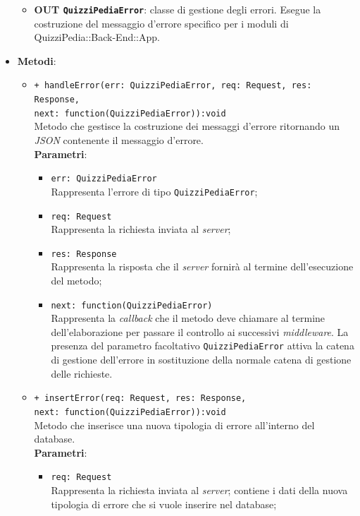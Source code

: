 \begin{itemize}
\begin{itemize}
		\item \textbf{OUT \texttt{QuizziPediaError}}:
		classe di gestione degli errori. Esegue la costruzione del messaggio d'errore specifico per i moduli di QuizziPedia::Back-End::App.
	\end{itemize}
	\item \textbf{Metodi}:
	\begin{itemize}
		\item \texttt{+ handleError(err: QuizziPediaError, req: Request, res: Response, \\next: function(QuizziPediaError)):void}\\
		Metodo che gestisce la costruzione dei messaggi d'errore ritornando un \textit{JSON} contenente il messaggio d'errore.\\
		\textbf{Parametri}:
		\begin{itemize}
			\item \texttt{err: QuizziPediaError}\\
			Rappresenta l'errore di tipo \texttt{QuizziPediaError};
			\item \texttt{req: Request}\\
			Rappresenta la richiesta inviata al \textit{server};
			\item \texttt{res: Response}\\
			Rappresenta la risposta che il \textit{server} fornirà al termine dell'esecuzione del metodo;
			\item \texttt{next: function(QuizziPediaError)}\\
			Rappresenta la \textit{callback} che il metodo deve chiamare al termine dell'elaborazione per passare il controllo ai successivi \textit{middleware}. La presenza del parametro facoltativo \texttt{QuizziPediaError} attiva la catena di gestione dell'errore in sostituzione della normale catena di gestione delle richieste.
		\end{itemize}
		\item \texttt{+ insertError(req: Request, res: Response, \\next: function(QuizziPediaError)):void}\\
		Metodo che inserisce una nuova tipologia di errore all'interno del database.\\
		\textbf{Parametri}:
		\begin{itemize}
			\item \texttt{req: Request}\\
			Rappresenta la richiesta inviata al \textit{server}; contiene i dati della nuova tipologia di errore che si vuole inserire nel database;

\end{itemize}
\end{itemize}
\end{itemize}
